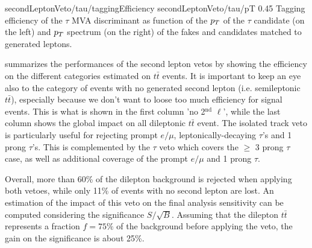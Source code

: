                      {secondLeptonVeto/tau/taggingEfficiency}
                     {secondLeptonVeto/tau/pT}
                     {0.45}
                     {Tagging efficiency of the $\tau$ MVA discriminant as function of the
                     $p_T$ of the $\tau$ candidate (on the left) and $p_T$ spectrum (on the
                     right) of the fakes and candidates matched to generated leptons.}

     summarizes the performances of the
    second lepton vetos by showing the efficiency on the different categories estimated on
    $t\bar{t}$ events. It is important to keep an eye also to the category of events with no
    generated second lepton (i.e. semileptonic $t\bar{t}$), especially because we don't
    want to loose too much efficiency for signal events. This is what is shown in the first
    column 'no 2$^\text{nd}$ $\ell$', while the last column shows the global impact on all
    dileptonic $t\bar{t}$ event. The isolated track veto is particularly useful for rejecting
    prompt $e/\mu$, leptonically-decaying $\tau$'s and 1 prong $\tau$'s. This is complemented
    by the $\tau$ veto which covers the $\geq$ 3 prong $\tau$ case, as well as additional
    coverage of the prompt $e/\mu$ and 1 prong $\tau$.

    Overall, more than 60\% of the dilepton background is rejected when applying both
    vetoes, while only 11\% of events with no second lepton are lost. An estimation of the
    impact of this veto on the final analysis sensitivity can be computed considering the
    significance $S/\sqrt{B}$. Assuming that the dilepton $t\bar{t}$ represents a fraction
    $f = 75\%$ of the background before applying the veto, the gain on the significance
    is about 25\%.

